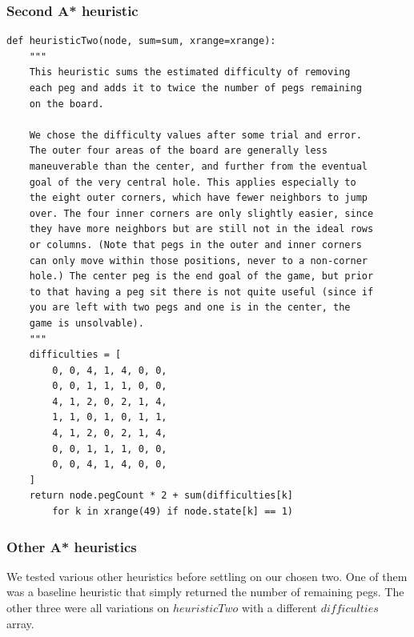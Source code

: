 \documentclass[11pt, letter]{article}
\begin{document}
\subsubsection{Second A* heuristic}


\begin{lstlisting}[frame=single]
def heuristicTwo(node, sum=sum, xrange=xrange):
	"""
	This heuristic sums the estimated difficulty of removing
	each peg and adds it to twice the number of pegs remaining
	on the board.

	We chose the difficulty values after some trial and error.
	The outer four areas of the board are generally less
	maneuverable than the center, and further from the eventual
	goal of the very central hole. This applies especially to
	the eight outer corners, which have fewer neighbors to jump
	over. The four inner corners are only slightly easier, since
	they have more neighbors but are still not in the ideal rows
	or columns. (Note that pegs in the outer and inner corners
	can only move within those positions, never to a non-corner
	hole.) The center peg is the end goal of the game, but prior
	to that having a peg sit there is not quite useful (since if
	you are left with two pegs and one is in the center, the
	game is unsolvable).
	"""
	difficulties = [
		0, 0, 4, 1, 4, 0, 0,
		0, 0, 1, 1, 1, 0, 0,
		4, 1, 2, 0, 2, 1, 4,
		1, 1, 0, 1, 0, 1, 1,
		4, 1, 2, 0, 2, 1, 4,
		0, 0, 1, 1, 1, 0, 0,
		0, 0, 4, 1, 4, 0, 0,
	]
	return node.pegCount * 2 + sum(difficulties[k]
		for k in xrange(49) if node.state[k] == 1)
\end{lstlisting}

\subsubsection{Other A* heuristics}

We tested various other heuristics before settling on our chosen two. One of
them was a baseline heuristic that simply returned the number of remaining
pegs. The other three were all variations on \(heuristicTwo\) with a different
\(difficulties\) array.
\end{document}
